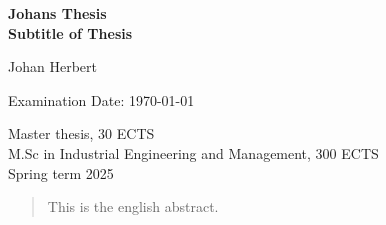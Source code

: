 \documentclass[%
a4paper,							
11pt,								
bibliography=totoc,						
abstracton=true					
]
{scrartcl}
\theoremstyle{plain}
\theoremstyle{definition}
\theoremstyle{remark}
\newcommand{\1}{\mathbbm{1}}
\begin{document}
\begin{titlepage}
\begin{center}
    \end{center}
\vspace*{5cm}
\begin{center}
    {%
        \color{white}
        \noindent
        \Huge
        \bfseries 
        \sffamily
        Johans Thesis
    }\\[1em]
    {%
        \color{white}
        \noindent
        \Large
        \bfseries 
        \sffamily
        Subtitle of Thesis
    }%
\end{center}
\renewcommand{\thefootnote}{\fnsymbol{footnote}}

\begin{center}
    \color{white}
    \large
    Johan Herbert%
    \footnotemark[2]{}
    \hspace{2em}
    \hspace{2em}
\end{center}
\begin{center}
    \color{white}
    \large
    Examination Date: \today
\end{center}
\vfill
\begin{center}
    Master thesis, 30 ECTS\\
    M.Sc in Industrial Engineering and Management, 300 ECTS\\
    Spring term 2025
\end{center}


\renewcommand{\thefootnote}{\arabic{footnote}}


\thispagestyle{empty}
\end{titlepage}


\begin{abstract}
    This is the english abstract.
\end{abstract}
\end{document}
